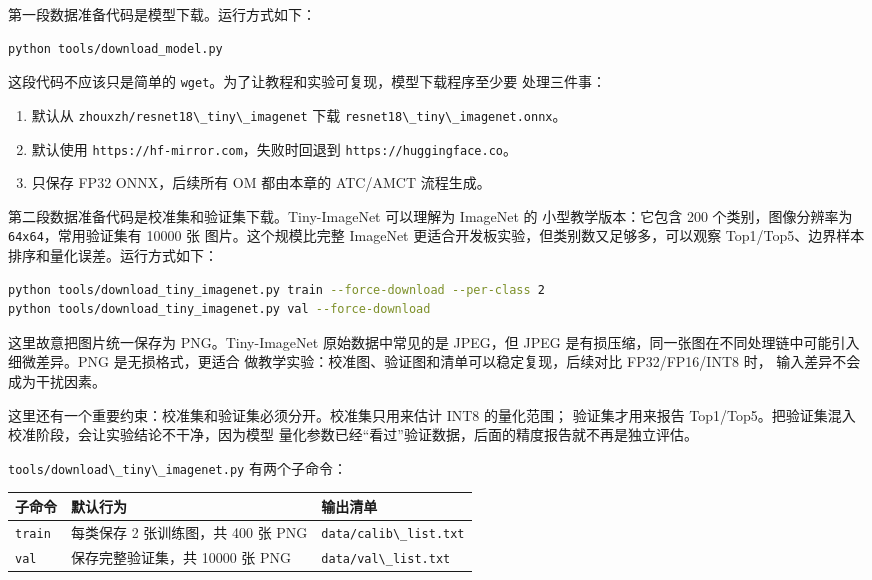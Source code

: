 第一段数据准备代码是模型下载。运行方式如下：

\begin{lstlisting}[language=bash]
python tools/download_model.py
\end{lstlisting}

这段代码不应该只是简单的
\passthrough{\lstinline!wget!}。为了让教程和实验可复现，模型下载程序至少要
处理三件事：

\begin{enumerate}
\def\labelenumi{\arabic{enumi}.}
\tightlist
\item
  默认从 \passthrough{\lstinline!zhouxzh/resnet18\_tiny\_imagenet!} 下载
  \passthrough{\lstinline!resnet18\_tiny\_imagenet.onnx!}。
\item
  默认使用 \passthrough{\lstinline!https://hf-mirror.com!}，失败时回退到
  \passthrough{\lstinline!https://huggingface.co!}。
\item
  只保存 FP32 ONNX，后续所有 OM 都由本章的 ATC/AMCT 流程生成。
\end{enumerate}

第二段数据准备代码是校准集和验证集下载。Tiny-ImageNet 可以理解为
ImageNet 的 小型教学版本：它包含 200 个类别，图像分辨率为
\passthrough{\lstinline!64x64!}，常用验证集有 10000 张
图片。这个规模比完整 ImageNet
更适合开发板实验，但类别数又足够多，可以观察
Top1/Top5、边界样本排序和量化误差。运行方式如下：

\begin{lstlisting}[language=bash]
python tools/download_tiny_imagenet.py train --force-download --per-class 2
python tools/download_tiny_imagenet.py val --force-download
\end{lstlisting}

这里故意把图片统一保存为 PNG。Tiny-ImageNet 原始数据中常见的是 JPEG，但
JPEG 是有损压缩，同一张图在不同处理链中可能引入细微差异。PNG
是无损格式，更适合
做教学实验：校准图、验证图和清单可以稳定复现，后续对比 FP32/FP16/INT8
时， 输入差异不会成为干扰因素。

这里还有一个重要约束：校准集和验证集必须分开。校准集只用来估计 INT8
的量化范围； 验证集才用来报告
Top1/Top5。把验证集混入校准阶段，会让实验结论不干净，因为模型
量化参数已经``看过''验证数据，后面的精度报告就不再是独立评估。

\passthrough{\lstinline!tools/download\_tiny\_imagenet.py!}
有两个子命令：

\begin{longtable}[]{@{}lll@{}}
\toprule\noalign{}
子命令 & 默认行为 & 输出清单 \\
\midrule\noalign{}
\endhead
\bottomrule\noalign{}
\endlastfoot
\passthrough{\lstinline!train!} & 每类保存 2 张训练图，共 400 张 PNG &
\passthrough{\lstinline!data/calib\_list.txt!} \\
\passthrough{\lstinline!val!} & 保存完整验证集，共 10000 张 PNG &
\passthrough{\lstinline!data/val\_list.txt!} \\
\end{longtable}

